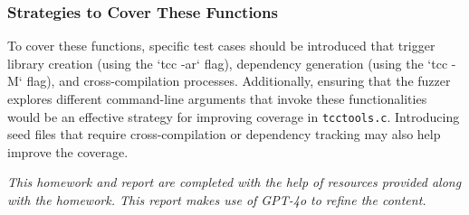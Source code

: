 \documentclass[conference]{IEEEtran}
\begin{document}
\subsubsection{Strategies to Cover These Functions}

To cover these functions, specific test cases should be introduced that trigger library creation (using the `tcc -ar` flag), dependency generation (using the `tcc -M` flag), and cross-compilation processes. Additionally, ensuring that the fuzzer explores different command-line arguments that invoke these functionalities would be an effective strategy for improving coverage in \texttt{tcctools.c}. Introducing seed files that require cross-compilation or dependency tracking may also help improve the coverage.

\vspace{12pt}
\textit{This homework and report are completed with the help of resources provided along with the homework. This report makes use of GPT-4o to refine the content.}
\end{document}
